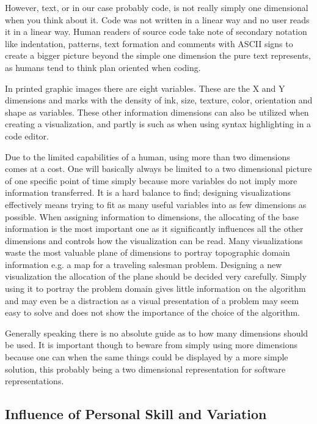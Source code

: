 \documentclass[11pt, a4paper, ngerman, twoside]{article}
\theoremstyle{plain}\newtheorem{Lemma}{Lemma}
\theoremstyle{plain}\newtheorem{Satz}[Lemma]{Satz}
\theoremstyle{definition}\newtheorem{Definition}[Lemma]{Definition}
\theoremstyle{definition}\newtheorem*{Beispiel}{Beispiel}
\theoremstyle{remark}\newtheorem*{Bemerkung}{Bemerkung}
\begin{document}
However, text, or in our case probably code, is not really simply one dimensional when you think about it. Code was not written in a linear way and no user reads it in a linear way. Human readers of source code take note of secondary notation \cite{green} like indentation, patterns, text formation and comments with ASCII signs to create a bigger picture beyond the simple one dimension the pure text represents, as humans tend to think plan oriented when coding.

In printed graphic images there are eight variables\cite{bertin}. These are the X and Y dimensions and marks with the density of ink, size, texture, color, orientation and shape as variables. These other information dimensions can also be utilized when creating a visualization, and partly is such as when using syntax highlighting in a code editor.

Due to the limited capabilities of a human, using more than two dimensions comes at a cost. One will basically always be limited to a two dimensional picture of one specific point of time simply because more variables do not imply more information transferred. It is a hard balance to find; designing visualizations effectively means trying to fit as many useful variables into as few dimensions as possible. When assigning information to dimensions, the allocating of the base information is the most important one as it significantly influences all the other dimensions and controls how the visualization can be read. Many visualizations waste the most valuable plane of dimensions to portray topographic domain information e.g. a map for a traveling salesman problem. Designing a new visualization the allocation of the plane should be decided very carefully. Simply using it to portray the problem domain gives little information on the algorithm and may even be a distraction as a visual presentation of a problem may seem easy to solve and does not show the importance of the choice of the algorithm\cite{macgregor}.

Generally speaking there is no absolute guide as to how many dimensions should be used. It is important though to beware from simply using more dimensions because one can when the same things could be displayed by a more simple solution, this probably being a two dimensional representation for software representations.

\subsection{Influence of Personal Skill and Variation}
\end{document}
